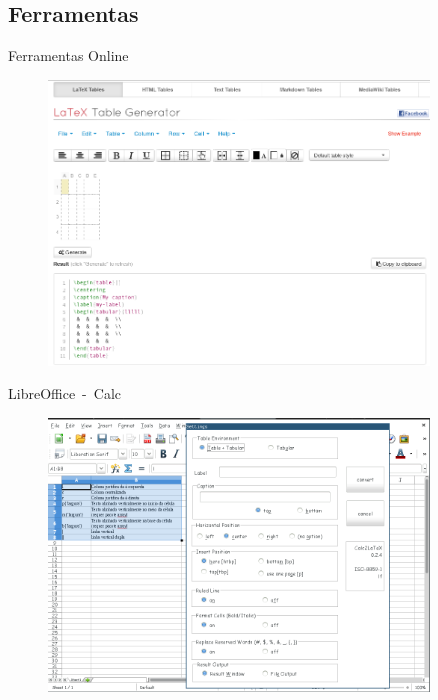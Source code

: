 \subsection{Ferramentas}
\begin{frame}{Ferramentas Online}
	
\begin{figure}[htbp!]
	\centering
	\includegraphics[width=0.9\textwidth]{figuras/table_online.png}
	\caption{ }
	\label{fig:tableOnline}
\end{figure}

\end{frame}

\begin{frame}{LibreOffice~-~Calc}
\begin{figure}[htbp!]
	\centering
	\includegraphics[width=0.9\textwidth]{figuras/calc1.png}
	\caption{ }
	\label{fig:tableOnline}
\end{figure}
\end{frame}

